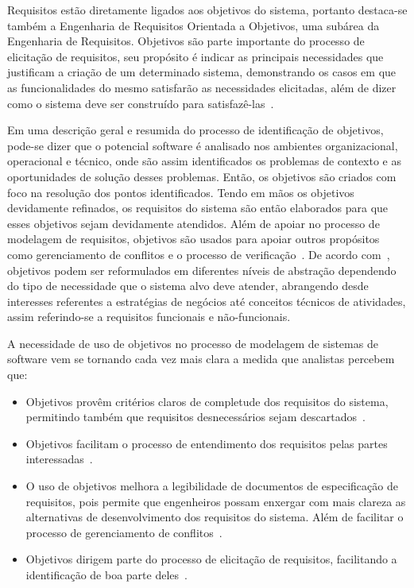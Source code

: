 Requisitos estão diretamente ligados aos objetivos do sistema, portanto destaca-se também a Engenharia de Requisitos Orientada a Objetivos, uma subárea da Engenharia de Requisitos. Objetivos são parte importante do processo de elicitação de requisitos, seu propósito é indicar as principais necessidades que justificam a criação de um determinado sistema, demonstrando os casos em que as funcionalidades do mesmo satisfarão as necessidades elicitadas, além de dizer como o sistema deve ser construído para satisfazê-las~\cite{ross1977structured}. 

Em uma descrição geral e resumida do processo de identificação de objetivos, pode-se dizer que o potencial software é analisado nos ambientes organizacional, operacional e técnico, onde são assim identificados os problemas de contexto e as oportunidades de solução desses problemas. Então, os objetivos são criados com foco na resolução dos pontos identificados. Tendo em mãos os objetivos devidamente refinados, os requisitos do sistema são então elaborados para que esses objetivos sejam devidamente atendidos. Além de apoiar no processo de modelagem de requisitos, objetivos são usados para apoiar outros propósitos como gerenciamento de conflitos e o processo de verificação~\cite{lapouchnian2005goal}. De acordo com~\cite{van2001goal}, objetivos podem ser reformulados em diferentes níveis de abstração dependendo do tipo de necessidade que o sistema alvo deve atender, abrangendo desde interesses referentes a estratégias de negócios até conceitos técnicos de atividades, assim referindo-se a requisitos funcionais e não-funcionais.

A necessidade de uso de objetivos no processo de modelagem de sistemas de software vem se tornando cada vez mais clara a medida que analistas percebem que:
\begin{itemize}
	\item Objetivos provêm critérios claros de completude dos requisitos do sistema, permitindo também que requisitos desnecessários sejam descartados~\cite{van2001goal}.
	
	\item Objetivos facilitam o processo de entendimento dos requisitos pelas partes interessadas~\cite{van2001goal}.
	
	\item O uso de objetivos melhora a legibilidade de documentos de especificação de requisitos, pois permite que engenheiros possam enxergar com mais clareza as alternativas de desenvolvimento dos requisitos do sistema. Além de facilitar o processo de gerenciamento de conflitos~\cite{van2001goal}.
	
	\item Objetivos dirigem parte do processo de elicitação de requisitos, facilitando a identificação de boa parte deles~\cite{lapouchnian2005goal}.	
\end{itemize}

